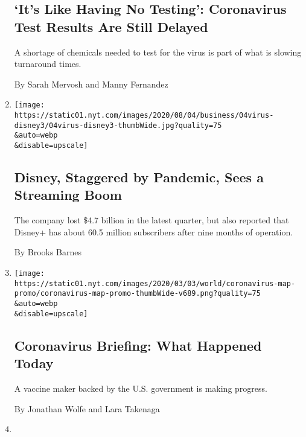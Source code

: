 \begin{enumerate}
  \hypertarget{its-like-having-no-testing-coronavirus-test-results-are-still-delayed}{%
  \subsection{`It's Like Having No Testing': Coronavirus Test Results
  Are Still
  Delayed}\label{its-like-having-no-testing-coronavirus-test-results-are-still-delayed}}

  A shortage of chemicals needed to test for the virus is part of what
  is slowing turnaround times.

  By Sarah Mervosh and Manny Fernandez
\item
  \href{/2020/08/04/business/media/disney-earnings-coronavirus.html}{}

  \texttt{[image: https://static01.nyt.com/images/2020/08/04/business/04virus-disney3/04virus-disney3-thumbWide.jpg?quality=75\\\&auto=webp\\\&disable=upscale]}

  \hypertarget{disney-staggered-by-pandemic-sees-a-streaming-boom}{%
  \subsection{Disney, Staggered by Pandemic, Sees a Streaming
  Boom}\label{disney-staggered-by-pandemic-sees-a-streaming-boom}}

  The company lost \$4.7 billion in the latest quarter, but also
  reported that Disney+ has about 60.5 million subscribers after nine
  months of operation.

  By Brooks Barnes
\item
  \href{/2020/08/04/us/coronavirus-today.html}{}

  \texttt{[image: https://static01.nyt.com/images/2020/03/03/world/coronavirus-map-promo/coronavirus-map-promo-thumbWide-v689.png?quality=75\\\&auto=webp\\\&disable=upscale]}

  \hypertarget{coronavirus-briefing-what-happened-today}{%
  \subsection{Coronavirus Briefing: What Happened
  Today}\label{coronavirus-briefing-what-happened-today}}

  A vaccine maker backed by the U.S. government is making progress.

  By Jonathan Wolfe and Lara Takenaga
\item
  \href{/2020/08/04/briefing/vaccine-stimulus-beirut.html}{}


\end{enumerate}
